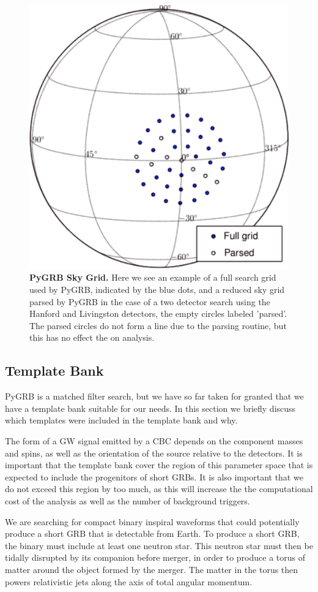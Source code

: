 \documentclass[11pt]{cuthesis}
\begin{document}
\begin{figure} %
\begin{center}
\includegraphics[width=0.6\linewidth]{skypatch.png}
\end{center}
\caption{\textbf{PyGRB Sky Grid.} Here we see an example of a full search grid used by PyGRB, indicated by the blue dots, and a reduced sky grid parsed by PyGRB in the case of a two detector search using the Hanford and Livingston detectors, the empty circles labeled 'parsed'. The parsed circles do not form a line due to the parsing routine, but this has no effect the on analysis. \cite{pygrb_Williamson:2014}}
\label{fig:skypatch}
\end{figure}

\subsection{Template Bank}
PyGRB is a matched filter search, but we have so far taken for granted that we have a template bank suitable for our needs. In this section we briefly discuss which templates were included in the template bank and why. 

The form of a GW signal emitted by a CBC depends on the component masses and spins, as well as the orientation of the source relative to the detectors. It is important that the template bank cover the region of this parameter space that is expected to include the progenitors of short GRBs. It is also important that we do not exceed this region by too much, as this will increase the the computational cost of the analysis as well as the number of background triggers.  

We are searching for compact binary inspiral waveforms that could potentially produce a short GRB that is detectable from Earth. To produce a short GRB, the binary must include at least one neutron star. This neutron star must then be tidally disrupted by its companion before merger, in order to produce a torus of matter around the object formed by the merger. \cite{Eichler:1989ve, NAKAR2007166, Narayan:1992iy, Paczynski:1991aq} The matter in the torus then powers relativistic jets along the axis of total angular momentum. \cite{lee_2007} 
\end{document}
